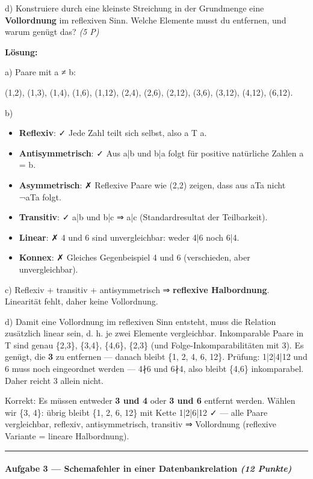 \documentclass[11pt, a4paper]{article}
\begin{document}
d) Konstruiere durch eine kleinste Streichung in der Grundmenge eine \textbf{Vollordnung} im reflexiven Sinn. Welche Elemente musst du entfernen, und warum genügt das? \textit{(5 P)}


\textbf{Lösung:}


a) Paare mit a ≠ b:

(1,2), (1,3), (1,4), (1,6), (1,12), (2,4), (2,6), (2,12), (3,6), (3,12), (4,12), (6,12).


b)

\begin{itemize}
  \item \textbf{Reflexiv}: ✓ Jede Zahl teilt sich selbst, also a T a.
  \item \textbf{Antisymmetrisch}: ✓ Aus a|b und b|a folgt für positive natürliche Zahlen a = b.
  \item \textbf{Asymmetrisch}: ✗ Reflexive Paare wie (2,2) zeigen, dass aus aTa nicht ¬aTa folgt.
  \item \textbf{Transitiv}: ✓ a|b und b|c ⇒ a|c (Standardresultat der Teilbarkeit).
  \item \textbf{Linear}: ✗ 4 und 6 sind unvergleichbar: weder 4|6 noch 6|4.
  \item \textbf{Konnex}: ✗ Gleiches Gegenbeispiel 4 und 6 (verschieden, aber unvergleichbar).
\end{itemize}

c) Reflexiv + transitiv + antisymmetrisch ⇒ \textbf{reflexive Halbordnung}. Linearität fehlt, daher keine Vollordnung.


d) Damit eine Vollordnung im reflexiven Sinn entsteht, muss die Relation zusätzlich linear sein, d. h. je zwei Elemente vergleichbar. Inkomparable Paare in T sind genau \{2,3\}, \{3,4\}, \{4,6\}, \{2,3\} (und Folge-Inkomparabilitäten mit 3). Es genügt, die \textbf{3} zu entfernen — danach bleibt \{1, 2, 4, 6, 12\}. Prüfung: 1|2|4|12 und 6 muss noch eingeordnet werden — 4∤6 und 6∤4, also bleibt \{4,6\} inkomparabel. Daher reicht 3 allein nicht.


Korrekt: Es müssen entweder \textbf{3 und 4} oder \textbf{3 und 6} entfernt werden. Wählen wir \{3, 4\}: übrig bleibt \{1, 2, 6, 12\} mit Kette 1|2|6|12 ✓ — alle Paare vergleichbar, reflexiv, antisymmetrisch, transitiv ⇒ Vollordnung (reflexive Variante = lineare Halbordnung).



\noindent\textcolor{rulegray}{\rule{\linewidth}{0.4pt}}


\paragraph{Aufgabe 3 — Schemafehler in einer Datenbankrelation \textit{(12 Punkte)}}\mbox{}\\[2pt]
\end{document}
